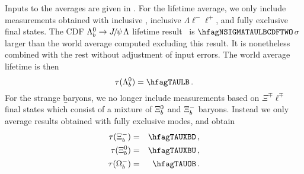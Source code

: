 Inputs to the averages are given in .
For the \Lb lifetime average, we only include measurements obtained
with inclusive , inclusive
$\Lambda \ell^- \ell^+$, and fully exclusive
final states.
The CDF $\Lambda_b^0 \to {J\mskip -3mu/\mskip -2mu\psi\mskip 2mu} \Lambda$
lifetime result~\cite{Aaltonen:2014wfa,*Aaltonen:2014wfa_cont} 
is $\hfagNSIGMATAULBCDFTWO\,\sigma$
larger than the world average computed excluding this result. 
It is nonetheless combined with the rest 
without adjustment of input errors.
The world average \Lb lifetime is then
\begin{equation}
\tau(\Lb) = \hfagTAULB \,. 
\end{equation}
For the strange \b baryons, we no longer include measurements based on
$\Xi^{\mp} \ell^{\mp}$~\cite{Buskulic:1996sm,Abdallah:2005cw,Abreu:1995kt} 
final states which consist of a mixture of 
$\Xi_b^0$ and $\Xi_b^-$ baryons. Instead we only average results obtained with 
fully exclusive modes, and obtain
\begin{eqnarray}
\tau(\Xibd) &=& \hfagTAUXBD \,, \\
\tau(\Xibu) &=& \hfagTAUXBU \,, \\
\tau(\Omegab) &=& \hfagTAUOB \,. 
\end{eqnarray}


